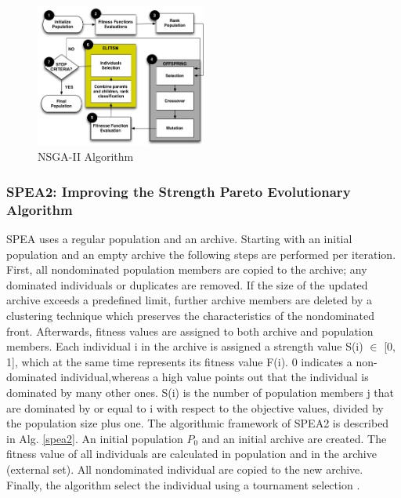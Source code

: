\documentclass{report}
\begin{document}
\begin{figure}[h]
\centering
\includegraphics[width=0.5\textwidth]{./images/NSGA-2.png}
\caption{NSGA-II Algorithm}
\label{fig:nsga2}
\end{figure}

\subsubsection{SPEA2: Improving the Strength Pareto Evolutionary Algorithm}

SPEA uses a regular population and an archive. Starting with an initial population and an empty archive the following steps are performed per iteration. First, all nondominated population members are copied to the archive; any dominated individuals or duplicates are removed. If the size of the updated archive exceeds a predefined limit, further archive members are deleted by a clustering technique which preserves the characteristics of the nondominated front. Afterwards, fitness values are assigned to both archive and population members. Each individual i in the archive is assigned a strength value S(i) $\in$ [0, 1], which at the same time represents its fitness value F(i). 0 indicates a non-dominated individual,whereas a high value points out that the individual is dominated by many other ones. S(i) is the number of population members j that are dominated by or equal to i with respect to the objective values, divided by the population size plus one. The algorithmic framework of SPEA2 is described in Alg. \ref{spea2}. An initial population $P_{0}$ and an initial archive are created. The fitness value of all individuals are calculated in population and in the archive (external set). All nondominated individual are copied to the new archive. Finally, the algorithm select the individual using a tournament selection \cite{Zitzler2001} \cite{Tervonen2017} \cite{MatneiFilho2016}.
\end{document}
